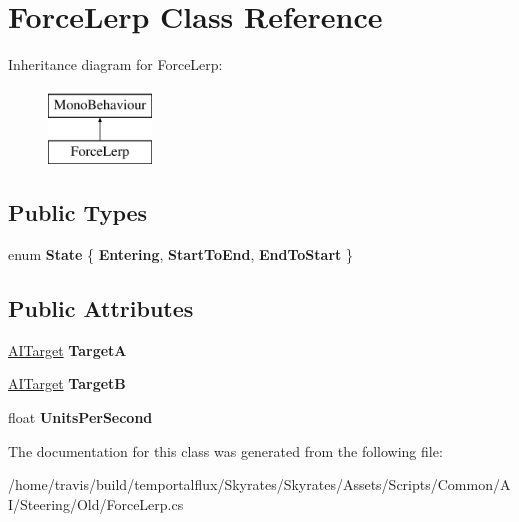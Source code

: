 \hypertarget{class_force_lerp}{\section{Force\-Lerp Class Reference}
\label{class_force_lerp}
}
Inheritance diagram for Force\-Lerp\-:\begin{figure}[H]
\begin{center}
\leavevmode
\includegraphics[height=2.000000cm]{class_force_lerp}
\end{center}
\end{figure}
\subsection*{Public Types}
\begin{DoxyCompactItemize}
\item 
enum {\bfseries State} \{ {\bfseries Entering}, 
{\bfseries Start\-To\-End}, 
{\bfseries End\-To\-Start}
 \}
\end{DoxyCompactItemize}
\subsection*{Public Attributes}
\begin{DoxyCompactItemize}
\item 
\hypertarget{class_force_lerp_a3a49eaf612b0994871f06c0fd0216a8e}{\hyperlink{class_a_i_target}{A\-I\-Target} {\bfseries Target\-A}}\label{class_force_lerp_a3a49eaf612b0994871f06c0fd0216a8e}

\item 
\hypertarget{class_force_lerp_a87dff72a65e7818e3b2349a61acb34bf}{\hyperlink{class_a_i_target}{A\-I\-Target} {\bfseries Target\-B}}\label{class_force_lerp_a87dff72a65e7818e3b2349a61acb34bf}

\item 
\hypertarget{class_force_lerp_acc40eecdc23875d3ca598951a6780845}{float {\bfseries Units\-Per\-Second}}\label{class_force_lerp_acc40eecdc23875d3ca598951a6780845}

\end{DoxyCompactItemize}


The documentation for this class was generated from the following file\-:\begin{DoxyCompactItemize}
\item 
/home/travis/build/temportalflux/\-Skyrates/\-Skyrates/\-Assets/\-Scripts/\-Common/\-A\-I/\-Steering/\-Old/Force\-Lerp.\-cs\end{DoxyCompactItemize}
